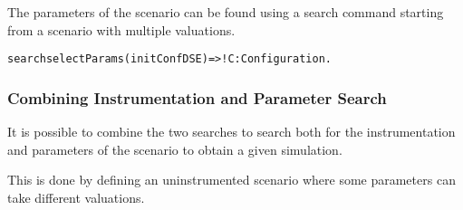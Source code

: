 The parameters of the scenario can be found using a search command starting from a scenario with multiple valuations.
\begin{alltt}
  \small
  search selectParams(initConfDSE)  =>! C:Configuration .
\end{alltt}

\subsubsection{Combining Instrumentation and Parameter Search}
It is possible to combine the two searches to search both for the instrumentation and parameters of the scenario to obtain a given simulation.

This is done by defining an uninstrumented scenario where some parameters can take different valuations.


